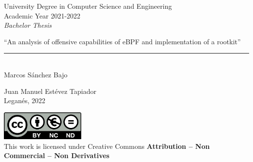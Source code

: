 \documentclass[12pt]{report} %
\begin{document}

\begin{titlepage}
	\begin{sffamily}
	\color{azulUC3M}
	\begin{center}
		\begin{figure}[H] %
		\end{figure}
		\vspace{2.5cm}
		\begin{Large}
			University Degree in Computer Science and Engineering\\
			Academic Year 2021-2022\\
			\vspace{2cm}
			\textsl{Bachelor Thesis}
			\bigskip

		\end{Large}
		 	{\Huge ``An analysis of offensive capabilities of eBPF and implementation of a rootkit''}\\
		 	\vspace*{0.5cm}
	 		\rule{10.5cm}{0.1mm}\\
			\vspace*{0.9cm}
			{\LARGE Marcos Sánchez Bajo}\\
			\vspace*{1cm}
		\begin{Large}
			Juan Manuel Estévez Tapiador\\
			Leganés, 2022\\
		\end{Large}
	\end{center}
	\vfill
	\color{black}
	\includegraphics[width=4.2cm]{images/creativecommons.png}\\
	This work is licensed under Creative Commons \textbf{Attribution – Non Commercial – Non Derivatives}
	\end{sffamily}
\end{titlepage}

\newpage
\thispagestyle{empty}
\mbox{}
\end{document}
